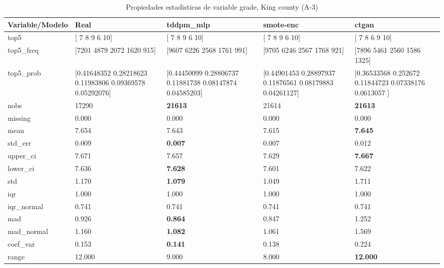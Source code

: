 \begin{table}[H]
\centering
\fontsize{8}{14}\selectfont
\caption{Propiedades  estadisticas de variable grade, King county (A-3)}
\label{table-stats-king county-a-3-grade}
\begin{tabular}{|l|m{10em}|m{10em}|m{10em}|m{10em}|}
\hline
 \rowcolor[gray]{0.8}
Variable/Modelo & Real & tddpm\_mlp & smote-enc & ctgan \\
\hline top5 & [ 7  8  9  6 10] & [ 7  8  9  6 10] & [ 7  8  9  6 10] & [ 7  8  6  9 10] \\
\hline top5\_freq & [7201 4879 2072 1620  915] & [9607 6226 2568 1761  991] & [9705 6246 2567 1768  921] & [7896 5461 2560 1586 1325] \\
\hline top5\_prob & [0.41648352 0.28218623 0.11983806 0.09369578 0.05292076] & [0.44450099 0.28806737 0.11881738 0.08147874 0.04585203] & [0.44901453 0.28897937 0.11876561 0.08179883 0.04261127] & [0.36533568 0.252672   0.11844723 0.07338176 0.0613057 ] \\
\hline nobs & 17290 & \bfseries 21613 & \cellcolor[rgb]{0.9, 0.54, 0.52} 21614 & \bfseries 21613 \\
\hline missing & 0.000 & 0.000 & 0.000 & 0.000 \\
\hline mean & 7.654 & 7.643 & \cellcolor[rgb]{0.9, 0.54, 0.52} 7.615 & \bfseries 7.645 \\
\hline std\_err & 0.009 & \bfseries 0.007 & 0.007 & \cellcolor[rgb]{0.9, 0.54, 0.52} 0.012 \\
\hline upper\_ci & 7.671 & 7.657 & \cellcolor[rgb]{0.9, 0.54, 0.52} 7.629 & \bfseries 7.667 \\
\hline lower\_ci & 7.636 & \bfseries 7.628 & \cellcolor[rgb]{0.9, 0.54, 0.52} 7.601 & 7.622 \\
\hline std & 1.170 & \bfseries 1.079 & 1.049 & \cellcolor[rgb]{0.9, 0.54, 0.52} 1.711 \\
\hline iqr & 1.000 & 1.000 & 1.000 & 1.000 \\
\hline iqr\_normal & 0.741 & 0.741 & 0.741 & 0.741 \\
\hline mad & 0.926 & \bfseries 0.864 & 0.847 & \cellcolor[rgb]{0.9, 0.54, 0.52} 1.252 \\
\hline mad\_normal & 1.160 & \bfseries 1.082 & 1.061 & \cellcolor[rgb]{0.9, 0.54, 0.52} 1.569 \\
\hline coef\_var & 0.153 & \bfseries 0.141 & 0.138 & \cellcolor[rgb]{0.9, 0.54, 0.52} 0.224 \\
\hline range & 12.000 & 9.000 & \cellcolor[rgb]{0.9, 0.54, 0.52} 8.000 & \bfseries 12.000 \\

\end{tabular}
\end{table}
